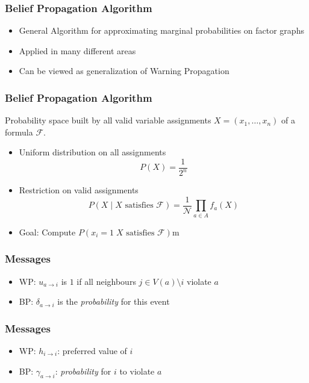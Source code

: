 \begin{frame}
	\frametitle{Belief Propagation Algorithm}
	\begin{itemize}
		\item General Algorithm for approximating marginal probabilities on factor graphs
		\item Applied in many different areas
		\item Can be viewed as generalization of Warning Propagation
	\end{itemize}
\end{frame}

\begin{frame}
	\frametitle{Belief Propagation Algorithm}
	Probability space built by all valid variable assignments $X = (x_1, \ldots, x_n)$ of a formula $\mathcal{F}$.
	\begin{itemize}
		\item Uniform distribution on all assignments 
		$$P(X) = \frac{1}{2^n}$$
		\item Restriction on valid assignments
	$$P(X \; | \; X \text{ satisfies } \mathcal{F}) = \frac{1}{\mathcal{N}} \prod_{a \in A} f_a(X)$$
	\item Goal: Compute $P(x_i = 1 \; X \text{ satisfies } \mathcal{F})$m
	\end{itemize}
\end{frame}

\begin{frame}
	\frametitle{Messages}
	
	\begin{itemize}
		\item WP: $u_{a \rightarrow i}$ is $1$ if all neighbours $j \in V(a) \setminus i$ violate $a$
		\item BP: $\delta_{a \rightarrow i}$ is the \emph{probability} for this event
	\end{itemize}
	
	
\end{frame}

\begin{frame}
	\frametitle{Messages}
	
	\begin{itemize}
		\item WP: $h_{i \rightarrow i}$: preferred value of $i$
		\item BP: $\gamma_{a \rightarrow i}$: \emph{probability} for $i$ to violate $a$
	\end{itemize}
	
	
\end{frame}